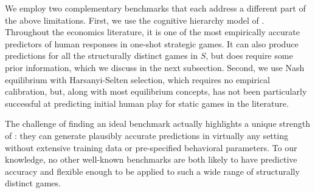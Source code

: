 We employ two complementary benchmarks that each address a different part of the above limitations.
First, we use the cognitive hierarchy model of \cite{Camerer2004Cognitive}.
Throughout the economics literature, it is one of the most empirically accurate predictors of human responses in one-shot strategic games.
It can also produce predictions for all the structurally distinct games in $S$, but does require some prior information, which we discuss in the next subsection.
Second, we use Nash equilibrium with Harsanyi-Selten selection, which requires no empirical calibration, but, along with most equilibrium concepts, has not been particularly successful at predicting initial human play for static games in the literature. 

The challenge of finding an ideal benchmark actually highlights a unique strength of : they can generate plausibly accurate predictions in virtually any setting without extensive training data or pre-specified behavioral parameters.
To our knowledge, no other well-known benchmarks are both likely to have predictive accuracy and flexible enough to be applied to such a wide range of structurally distinct games.
